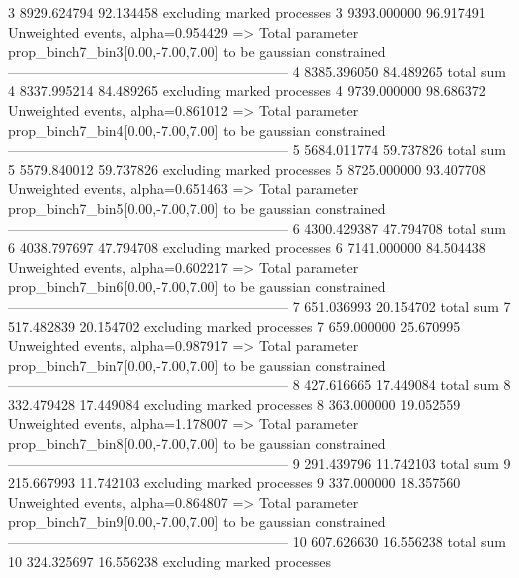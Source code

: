 3          8929.624794     92.134458       excluding marked processes    
3          9393.000000     96.917491       Unweighted events, alpha=0.954429
  => Total parameter prop_binch7_bin3[0.00,-7.00,7.00] to be gaussian constrained
------------------------------------------------------------
4          8385.396050     84.489265       total sum                     
4          8337.995214     84.489265       excluding marked processes    
4          9739.000000     98.686372       Unweighted events, alpha=0.861012
  => Total parameter prop_binch7_bin4[0.00,-7.00,7.00] to be gaussian constrained
------------------------------------------------------------
5          5684.011774     59.737826       total sum                     
5          5579.840012     59.737826       excluding marked processes    
5          8725.000000     93.407708       Unweighted events, alpha=0.651463
  => Total parameter prop_binch7_bin5[0.00,-7.00,7.00] to be gaussian constrained
------------------------------------------------------------
6          4300.429387     47.794708       total sum                     
6          4038.797697     47.794708       excluding marked processes    
6          7141.000000     84.504438       Unweighted events, alpha=0.602217
  => Total parameter prop_binch7_bin6[0.00,-7.00,7.00] to be gaussian constrained
------------------------------------------------------------
7          651.036993      20.154702       total sum                     
7          517.482839      20.154702       excluding marked processes    
7          659.000000      25.670995       Unweighted events, alpha=0.987917
  => Total parameter prop_binch7_bin7[0.00,-7.00,7.00] to be gaussian constrained
------------------------------------------------------------
8          427.616665      17.449084       total sum                     
8          332.479428      17.449084       excluding marked processes    
8          363.000000      19.052559       Unweighted events, alpha=1.178007
  => Total parameter prop_binch7_bin8[0.00,-7.00,7.00] to be gaussian constrained
------------------------------------------------------------
9          291.439796      11.742103       total sum                     
9          215.667993      11.742103       excluding marked processes    
9          337.000000      18.357560       Unweighted events, alpha=0.864807
  => Total parameter prop_binch7_bin9[0.00,-7.00,7.00] to be gaussian constrained
------------------------------------------------------------
10         607.626630      16.556238       total sum                     
10         324.325697      16.556238       excluding marked processes    
